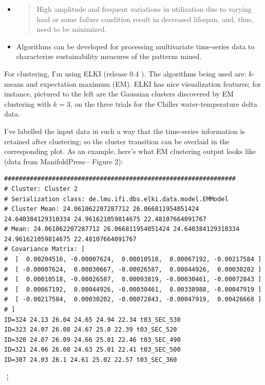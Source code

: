 \documentclass[10pt]{report}
\begin{document}
\begin{itemize}
\begin{quote}
   \end{quote}
 \item \cite[p.]{Patnaik2009}
   \begin{quote}
     High amplitude and frequent variations in utilization due to varying load or some failure condition result in decreased lifespan, and, thus, need to be minimized.
   \end{quote}
 \item Algorithms can be developed for processing multivariate time-series data to characterize sustainability measures of the patterns mined.
 \end{itemize}

 For clustering, I'm using ELKI (release 0.4 \cite{Achtert}). The algorithms being used are: $k$-means and expectation maximum (EM). ELKI has nice visualization features; for instance, pictured to the left are the Gaussian clusters discovered by EM clustering with $k=3$, on the three trials for the Chiller water-temperature delta data.
 
 I've labelled the input data in such a way that the time-series information is retained after clustering; so the cluster transition can be overlaid in the corresponding plot. As an example, here's what EM clustering output looks like (data from ManifoldPress---Figure 2):
 \begin{verbatim}
###############################################################
# Cluster: Cluster 2
# Serialization class: de.lmu.ifi.dbs.elki.data.model.EMModel
# Cluster Mean: 24.061062207287712 26.066811954051424 24.640384129310334 24.961621059814675 22.48107664091767
# Mean: 24.061062207287712 26.066811954051424 24.640384129310334 24.961621059814675 22.48107664091767
# Covariance Matrix: [
#  [  0.00204516, -0.00007624,  0.00010518,  0.00067192, -0.00217584 ]
#  [ -0.00007624,  0.00030667, -0.00026587,  0.00044926,  0.00030202 ]
#  [  0.00010518, -0.00026587,  0.00093819, -0.00030461, -0.00072843 ]
#  [  0.00067192,  0.00044926, -0.00030461,  0.00338988, -0.00047919 ]
#  [ -0.00217584,  0.00030202, -0.00072843, -0.00047919,  0.00426668 ]
# ]
ID=324 24.13 26.04 24.65 24.94 22.34 t03_SEC_530
ID=323 24.07 26.08 24.67 25.0 22.39 t03_SEC_520
ID=320 24.07 26.09 24.66 25.01 22.46 t03_SEC_490
ID=321 24.06 26.08 24.63 25.01 22.41 t03_SEC_500
ID=307 24.03 26.1 24.61 25.02 22.57 t03_SEC_360
\end{verbatim}
\vdots
\end{document}
